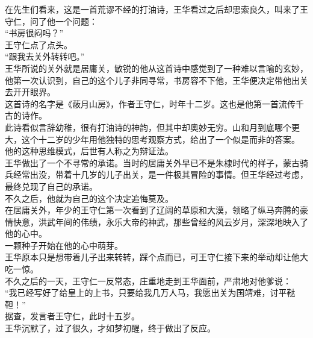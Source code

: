\begin{multicols}{\theparacolNo}
在先生们看来，这是一首荒谬不经的打油诗，王华看过之后却思索良久，叫来了王守仁，问了他一个问题：\\

“书房很闷吗？”\\

王守仁点了点头。\\

“跟我去关外转转吧。”\\

王华所说的关外就是居庸关，敏锐的他从这首诗中感觉到了一种难以言喻的玄妙，他第一次认识到，自己的这个儿子非同寻常，书房容不下他，王华便决定带他出关去开开眼界。\\

这首诗的名字是《蔽月山房》，作者王守仁，时年十二岁。这也是他第一首流传千古的诗作。\\

此诗看似言辞幼稚，很有打油诗的神韵，但其中却奥妙无穷。山和月到底哪个更大，这个十二岁的少年用他独特的思考观察方式，给出了一个似是而非的答案。\\

他的这种思维模式，后世有人称之为辩证法。\\

王华做出了一个不寻常的承诺。当时的居庸关外早已不是朱棣时代的样子，蒙古骑兵经常出没，带着十几岁的儿子出关，是一件极其冒险的事情。但王华经过考虑，最终兑现了自己的承诺。\\

不久之后，他就为自己的这个决定追悔莫及。\\

在居庸关外，年少的王守仁第一次看到了辽阔的草原和大漠，领略了纵马奔腾的豪情快意，洪武年间的伟绩，永乐大帝的神武，那些曾经的风云岁月，深深地映入了他的心中。\\

一颗种子开始在他的心中萌芽。\\

王华原本只是想带着儿子出来转转，踩个点而已，可王守仁接下来的举动却让他大吃一惊。\\

不久之后的一天，王守仁一反常态，庄重地走到王华面前，严肃地对他爹说：\\

“我已经写好了给皇上的上书，只要给我几万人马，我愿出关为国靖难，讨平鞑靼！”\\

据查，发言者王守仁，此时十五岁。\\

王华沉默了，过了很久，才如梦初醒，终于做出了反应。\\


\end{multicols}

